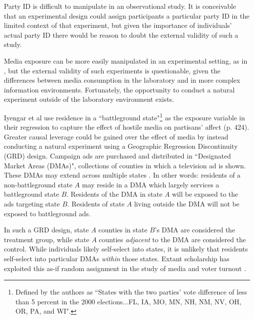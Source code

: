 \documentclass[12pt]{article}
\begin{document}
Party ID is difficult to manipulate in an observational study. It is conceivable that an experimental design could assign participants a particular party ID in the limited context of that experiment, but given the importance of individuals’ actual party ID there would be reason to doubt the external validity of such a study. 

Media exposure can be more easily manipulated in an experimental setting, as in \citet{mutz2007effects}, but the external validity of such experiments is questionable, given the differences between media consumption in the laboratory and in more complex information environments. Fortunately, the opportunity to conduct a natural experiment outside of the laboratory environment exists.

Iyengar et al use residence in a ``battleground state"\footnote{Defined by the authors as ``States with the two parties’ vote difference of less than 5 percent in the 2000 elections...FL, IA, MO, MN, NH, NM, NV, OH, OR, PA, and WI".} as the exposure variable in their regression to capture the effect of hostile media on partisans' affect (p. 424). Greater causal leverage could be gained over the effect of media by instead conducting a natural experiment using a Geographic Regression Discontinuity (GRD) design. Campaign ads are purchased and distributed in ``Designated Market Areas (DMAs)", collections of counties in which a television ad is shown. These DMAs may extend across multiple states \citep{keele2015geographic}. In other words: residents of a non-battleground state $A$ may reside in a DMA which largely services a battleground state $B$. Residents of the DMA in state $A$ will be exposed to the ads targeting state $B$. Residents of state $A$ living outside the DMA will not be exposed to battleground ads.

In such a GRD design, state $A$ counties in state $B$'s DMA are considered the treatment group, while state $A$ counties \textit{adjacent} to the DMA are considered the control. While individuals likely self-select into states, it is unlikely that residents self-select into particular DMAs \textit{within} those states. Extant scholarship has exploited this as-if random assignment in the study of media and voter turnout \cite{krasno2008televised, huber2007identifying}.





\end{document}
